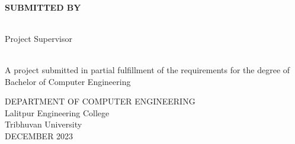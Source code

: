 \begin{center}
    \linespread{1.6}
    \thispagestyle{empty}
    \textbf{\large{\thetitle}} \\
    \vspace{2cm}

    \textbf{SUBMITTED BY} \\
    {\theauthor} \\

    \vspace{2cm}

    Project Supervisor\\
    {\thesupervisor} \\

    \vspace{2.2cm}

    A project submitted in partial fulfillment of the requirements for the degree of\\
    Bachelor of Computer Engineering

    \vspace{3cm}

    DEPARTMENT OF COMPUTER ENGINEERING \\
    Lalitpur Engineering College\\
    Tribhuvan University\\
    \vspace{2.4 in}
    DECEMBER 2023

\end{center}
